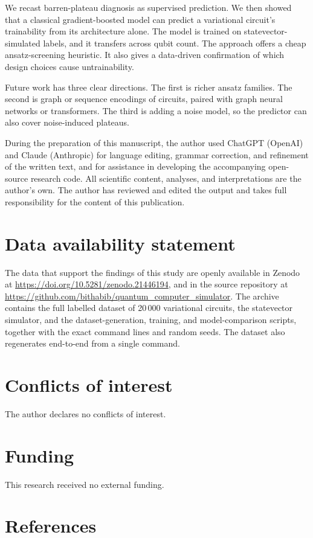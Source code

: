 \documentclass[12pt]{iopart}
\newcommand{\Nrows}{20\,000}
\begin{document}
We recast barren-plateau diagnosis as supervised prediction. We then showed that
a classical gradient-boosted model can predict a variational circuit's
trainability from its architecture alone. The model is trained on
statevector-simulated labels, and it transfers across qubit count. The approach
offers a cheap ansatz-screening heuristic. It also gives a data-driven
confirmation of which design choices cause untrainability.

Future work has three clear directions. The first is richer ansatz families. The
second is graph or sequence encodings of circuits, paired with graph neural
networks or transformers. The third is adding a noise model, so the predictor can
also cover noise-induced plateaus.

\ack
During the preparation of this manuscript, the author used ChatGPT (OpenAI) and
Claude (Anthropic) for language editing, grammar correction, and refinement of
the written text, and for assistance in developing the accompanying open-source
research code. All scientific content, analyses, and interpretations are the
author's own. The author has reviewed and edited the output and takes full
responsibility for the content of this publication.

\section*{Data availability statement}
The data that support the findings of this study are openly available in Zenodo
at \url{https://doi.org/10.5281/zenodo.21446194}, and in the source repository at
\url{https://github.com/bithabib/quantum_computer_simulator}. The archive
contains the full labelled dataset of \Nrows{} variational circuits, the
statevector simulator, and the dataset-generation, training, and model-comparison
scripts, together with the exact command lines and random seeds. The dataset also
regenerates end-to-end from a single command.

\section*{Conflicts of interest}
The author declares no conflicts of interest.

\section*{Funding}
This research received no external funding.

\section*{References}


\end{document}
